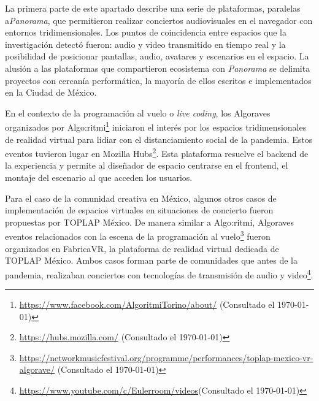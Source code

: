 



La primera parte de este apartado describe una serie de plataformas, paralelas a\textit{Panorama}, que permitieron realizar conciertos audiovisuales en el navegador con entornos tridimensionales. Los puntos de coincidencia entre espacios que la investigación detectó fueron: audio y video transmitido en tiempo real y la posibilidad de posicionar pantallas, audio, avatares y escenarios en el espacio. La alusión a las plataformas que compartieron ecosistema con \textit{Panorama} se delimita proyectos con cercanía performática, la mayoría de ellos escritos e implementados en la Ciudad de México. 

En el contexto de la programación al vuelo o \textit{live coding}, los Algoraves organizados por Algo:ritmi\footnote{\url{https://www.facebook.com/AlgoritmiTorino/about/} (Consultado el \today)} iniciaron el interés por los espacios tridimensionales de realidad virtual para lidiar con el distanciamiento social de la pandemia. Estos eventos tuvieron lugar en Mozilla Hubs\footnote{\url{https://hubs.mozilla.com/} (Consultado el \today)}. Esta plataforma resuelve el backend de la experiencia y permite al diseñador de espacio centrarse en el frontend, el montaje del escenario al que acceden los usuarios.


Para el caso de la comunidad creativa en México, algunos otros casos de implementación de espacios virtuales en situaciones de concierto fueron propuestas por TOPLAP México. De manera similar a Algo:ritmi, Algoraves eventos relacionados con la escena de la programación al vuelo\footnote{\url{https://networkmusicfestival.org/programme/performances/toplap-mexico-vr-algorave/} (Consultado el \today)} fueron organizados en FabricaVR, la plataforma de realidad virtual dedicada de TOPLAP México. Ambos casos forman parte de comunidades que antes de la pandemia, realizaban conciertos con tecnologías de transmisión de audio y video\footnote{\url{https://www.youtube.com/c/Eulerroom/videos}(Consultado el \today)}.%

